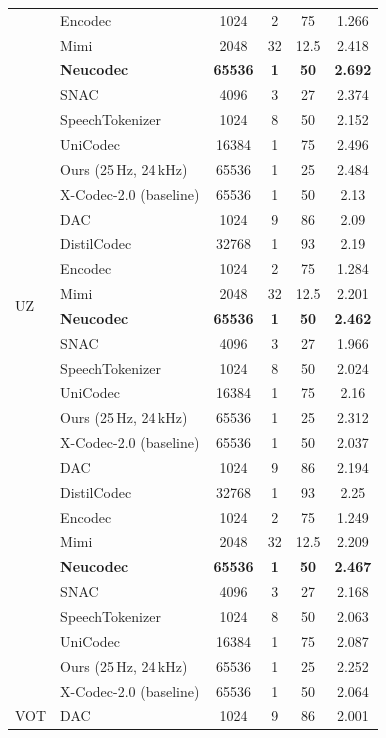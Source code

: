 \documentclass[preprint]{article}
\begin{document}
\begin{longtable}{llcccc}
  & Encodec & 1024 & 2 & 75 & 1.266 \\
  & Mimi & 2048 & 32 & 12.5 & 2.418 \\
  & \textbf{Neucodec} & \textbf{65536} & \textbf{1} & \textbf{50} & \textbf{2.692} \\
  & SNAC & 4096 & 3 & 27 & 2.374 \\
  & SpeechTokenizer & 1024 & 8 & 50 & 2.152 \\
  & UniCodec & 16384 & 1 & 75 & 2.496 \\
  & Ours (25\,Hz, 24\,kHz) & 65536 & 1 & 25 & 2.484 \\
  & X-Codec-2.0 (baseline) & 65536 & 1 & 50 & 2.13 \\
\midrule
\multirow{8}{*}{UZ}
  & DAC & 1024 & 9 & 86 & 2.09 \\
  & DistilCodec & 32768 & 1 & 93 & 2.19 \\
  & Encodec & 1024 & 2 & 75 & 1.284 \\
  & Mimi & 2048 & 32 & 12.5 & 2.201 \\
  & \textbf{Neucodec} & \textbf{65536} & \textbf{1} & \textbf{50} & \textbf{2.462} \\
  & SNAC & 4096 & 3 & 27 & 1.966 \\
  & SpeechTokenizer & 1024 & 8 & 50 & 2.024 \\
  & UniCodec & 16384 & 1 & 75 & 2.16 \\
  & Ours (25\,Hz, 24\,kHz) & 65536 & 1 & 25 & 2.312 \\
  & X-Codec-2.0 (baseline) & 65536 & 1 & 50 & 2.037 \\
\newpage
\multirow{8}{*}{VI}
  & DAC & 1024 & 9 & 86 & 2.194 \\
  & DistilCodec & 32768 & 1 & 93 & 2.25 \\
  & Encodec & 1024 & 2 & 75 & 1.249 \\
  & Mimi & 2048 & 32 & 12.5 & 2.209 \\
  & \textbf{Neucodec} & \textbf{65536} & \textbf{1} & \textbf{50} & \textbf{2.467} \\
  & SNAC & 4096 & 3 & 27 & 2.168 \\
  & SpeechTokenizer & 1024 & 8 & 50 & 2.063 \\
  & UniCodec & 16384 & 1 & 75 & 2.087 \\
  & Ours (25\,Hz, 24\,kHz) & 65536 & 1 & 25 & 2.252 \\
  & X-Codec-2.0 (baseline) & 65536 & 1 & 50 & 2.064 \\
\midrule
\multirow{8}{*}{VOT}
  & DAC & 1024 & 9 & 86 & 2.001 \\

\end{longtable}
\end{document}
